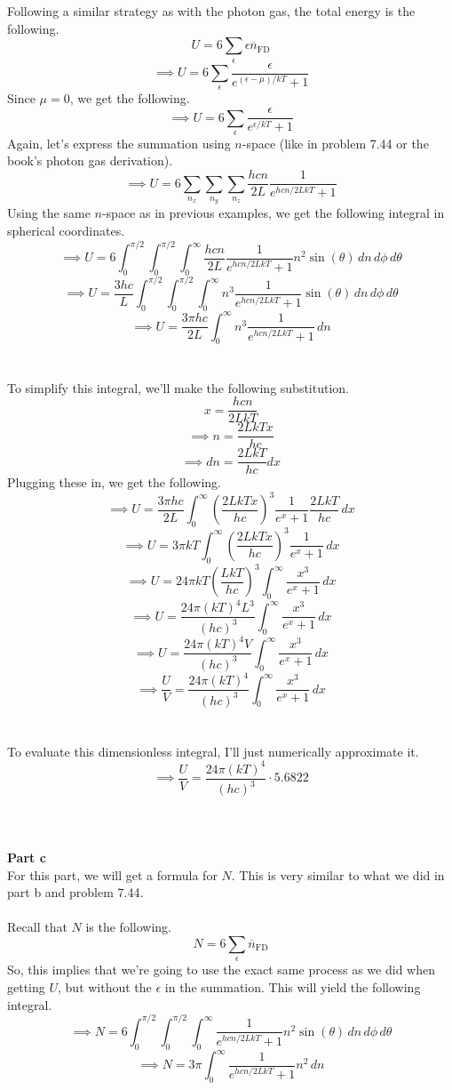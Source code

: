 \documentclass[12pt]{article}
\begin{document}
\begin{flushleft}
Following a similar strategy as with the photon gas, the total energy is the following.
$$U=6\sum_\epsilon\epsilon\overline{n}_\text{FD}$$
$$\implies U=6\sum_\epsilon\frac{\epsilon}{e^{(\epsilon-\mu)/kT}+1}$$
Since $\mu=0$, we get the following.
$$\implies U=6\sum_\epsilon\frac{\epsilon}{e^{\epsilon/kT}+1}$$
Again, let's express the summation using $n$-space (like in problem 7.44 or the book's photon gas derivation).
$$\implies U=6\sum_{n_x}\sum_{n_y}\sum_{n_z}\frac{hcn}{2L}\frac{1}{e^{hcn/2LkT}+1}$$
Using the same $n$-space as in previous examples, we get the following integral in spherical coordinates.
$$\implies U=6\int_0^{\pi/2}\int_0^{\pi/2}\int_0^\infty\frac{hcn}{2L}\frac{1}{e^{hcn/2LkT}+1}n^2\sin(\theta)\,dn\,d\phi\,d\theta$$
$$\implies U=\frac{3hc}{L}\int_0^{\pi/2}\int_0^{\pi/2}\int_0^\infty n^3\frac{1}{e^{hcn/2LkT}+1}\sin(\theta)\,dn\,d\phi\,d\theta$$
$$\implies U=\frac{3\pi hc}{2L}\int_0^\infty n^3\frac{1}{e^{hcn/2LkT}+1}\,dn$$\\~\\

To simplify this integral, we'll make the following substitution.
$$x=\frac{hcn}{2LkT}$$
$$\implies n=\frac{2LkTx}{hc}$$
$$\implies dn=\frac{2LkT}{hc}dx$$
Plugging these in, we get the following.
$$\implies U=\frac{3\pi hc}{2L}\int_0^\infty \left(\frac{2LkTx}{hc}\right)^3\frac{1}{e^{x}+1}\frac{2LkT}{hc}\,dx$$
$$\implies U=3\pi kT\int_0^\infty \left(\frac{2LkTx}{hc}\right)^3\frac{1}{e^{x}+1}\,dx$$
$$\implies U=24\pi kT\left(\frac{LkT}{hc}\right)^3\int_0^\infty\frac{x^3}{e^{x}+1}\,dx$$
$$\implies U=\frac{24\pi (kT)^4L^3}{(hc)^3}\int_0^\infty\frac{x^3}{e^{x}+1}\,dx$$
$$\implies U=\frac{24\pi (kT)^4V}{(hc)^3}\int_0^\infty\frac{x^3}{e^{x}+1}\,dx$$
$$\implies \frac{U}{V}=\frac{24\pi (kT)^4}{(hc)^3}\int_0^\infty\frac{x^3}{e^{x}+1}\,dx$$\\~\\

To evaluate this dimensionless integral, I'll just numerically approximate it.
$$\implies \frac{U}{V}=\frac{24\pi (kT)^4}{(hc)^3}\cdot5.6822$$\\~\\~\\



\textbf{Part c}\\
For this part, we will get a formula for $N$.
This is very similar to what we did in part b and problem 7.44.\\~\\

Recall that $N$ is the following.
$$N=6\sum_\epsilon\overline{n}_\text{FD}$$
So, this implies that we're going to use the exact same process as we did when getting $U$, but without the $\epsilon$ in the summation.
This will yield the following integral.
$$\implies N=6\int_0^{\pi/2}\int_0^{\pi/2}\int_0^\infty\frac{1}{e^{hcn/2LkT}+1}n^2\sin(\theta)\,dn\,d\phi\,d\theta$$
$$\implies N=3\pi\int_0^\infty\frac{1}{e^{hcn/2LkT}+1}n^2\,dn$$\\~\\


\end{flushleft}
\end{document}
